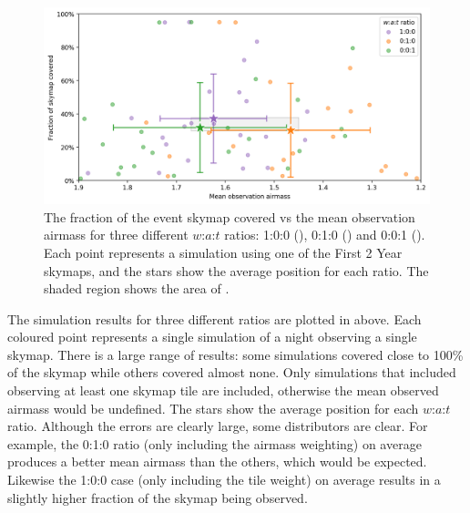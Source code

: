 \begin{colsection}
\begin{colsection}
\begin{figure}[t]
    \begin{center}
        \includegraphics[width=\linewidth]{images/sched_sim1.png}
    \end{center}
    \caption[Skymap coverage vs mean airmass for different $w$:$a$:$t$ ratios]{
        The fraction of the event skymap covered vs the mean observation airmass for three different $w$:$a$:$t$ ratios: 1:0:0 (), 0:1:0 () and 0:0:1 (). Each point represents a simulation using one of the First 2 Year skymaps, and the stars show the average position for each ratio. The shaded region shows the area of .
    }\label{fig:scheduler_sim_results1}
\end{figure}

The simulation results for three different ratios are plotted in  above. Each coloured point represents a single simulation of a night observing a single skymap. There is a large range of  results: some simulations covered close to 100\% of the skymap while others covered almost none. Only simulations that included observing at least one skymap tile are included, otherwise the mean observed airmass would be undefined. The stars show the average position for each $w$:$a$:$t$ ratio. Although the errors are clearly large, some distributors are clear. For example, the 0:1:0 ratio (only including the airmass weighting) on average produces a better mean airmass than the others, which would be expected. Likewise the 1:0:0 case (only including the tile weight) on average results in a slightly higher fraction of the skymap being observed.


\end{colsection}
\end{colsection}
